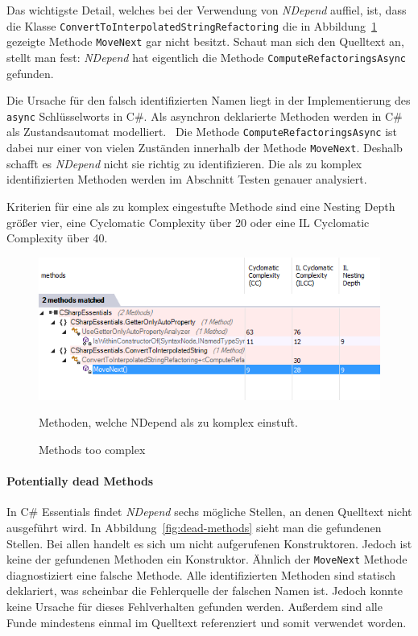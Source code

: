 Das wichtigste Detail, welches bei der Verwendung von \emph{NDepend} auffiel, ist, dass die Klasse \texttt{ConvertToInterpolatedStringRefactoring} die in Abbildung~\ref{fig:nd-methode-too-complex} gezeigte Methode \texttt{MoveNext} gar nicht besitzt. Schaut man sich den Quelltext an, stellt man fest: \emph{NDepend} hat eigentlich die Methode \texttt{ComputeRefactoringsAsync} gefunden.

Die Ursache für den falsch identifizierten Namen liegt in der Implementierung des \texttt{async} Schlüsselworts in C\#. Als asynchron deklarierte Methoden werden in C\# als Zustandsautomat modelliert.~\cite{csharp-async} Die Methode \texttt{ComputeRefactoringsAsync} ist dabei nur einer von vielen Zuständen innerhalb der Methode \texttt{MoveNext}. Deshalb schafft es \emph{NDepend} nicht sie richtig zu identifizieren. Die als zu komplex identifizierten Methoden werden im Abschnitt Testen genauer analysiert.

Kriterien für eine als zu komplex eingestufte Methode sind eine Nesting Depth größer vier, eine Cyclomatic Complexity über 20 oder eine IL Cyclomatic Complexity über 40.~\cite{nd-cc-criteria}

\begin{figure}[!ht]
	\centering
	\includegraphics[width=\textwidth]{images/methode-too-complex.png}
	\caption{Methods too complex}
	\vspace{0.1cm}
	Methoden, welche NDepend als zu komplex einstuft.
	\label{fig:nd-methode-too-complex}
\end{figure}

\paragraph{Potentially dead Methods} In C\# Essentials findet \emph{NDepend} sechs mögliche Stellen, an denen Quelltext nicht ausgeführt wird. In Abbildung~\ref{fig:dead-methods} sieht man die gefundenen Stellen. Bei allen handelt es sich um nicht aufgerufenen Konstruktoren. Jedoch ist keine der gefundenen Methoden ein Konstruktor. Ähnlich der \texttt{MoveNext} Methode diagnostiziert eine falsche Methode. Alle identifizierten Methoden sind statisch deklariert, was scheinbar die Fehlerquelle der falschen Namen ist. Jedoch konnte keine Ursache für dieses Fehlverhalten gefunden werden. Außerdem sind alle Funde mindestens einmal im Quelltext referenziert und somit verwendet worden.

